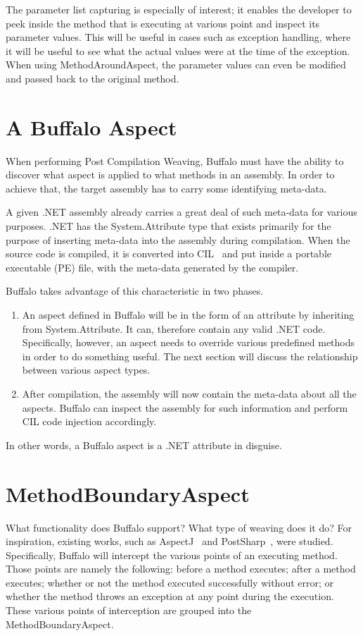 The parameter list capturing is especially of interest; it enables the developer to peek inside the method that is executing at various point and inspect its parameter values. This will be useful in cases such as exception handling, where it will be useful to see what the actual values were at the time of the exception. When using MethodAroundAspect, the parameter values can even be modified and passed back to the original method.


\section{A Buffalo Aspect}

When performing Post Compilation Weaving, Buffalo must have the ability to discover what aspect is applied to what methods in an assembly. In order to achieve that, the target assembly has to carry some identifying meta-data.

A given .NET assembly already carries a great deal of such meta-data for various purposes. .NET has the System.Attribute type that exists primarily for the purpose of inserting meta-data into the assembly during compilation. When the source code is compiled, it is converted into CIL~\cite{msil_text} and put inside a portable executable (PE) file, with the meta-data generated by the compiler. 

Buffalo takes advantage of this characteristic in two phases.
\begin{enumerate}
	\item An aspect defined in Buffalo will be in the form of an attribute by inheriting from System.Attribute. It can, therefore contain any valid .NET code. Specifically, however, an aspect needs to override various predefined methods in order to do something useful. The next section will discuss the relationship between various aspect types.
	\item After compilation, the assembly will now contain the meta-data about all the aspects. Buffalo can inspect the assembly for such information and perform CIL code injection accordingly.
\end{enumerate}

In other words, a Buffalo aspect is a .NET attribute in disguise.

\section{MethodBoundaryAspect}
What functionality does Buffalo support? What type of weaving does it do? For inspiration, existing works, such as AspectJ~\cite{aspectj_faq} and PostSharp~\cite{postsharp}, were studied. Specifically, Buffalo will intercept the various points of an executing method. Those points are namely the following: before a method executes; after a method executes; whether or not the method executed successfully without error; or whether the method throws an exception at any point during the execution. These various points of interception are grouped into the MethodBoundaryAspect.

